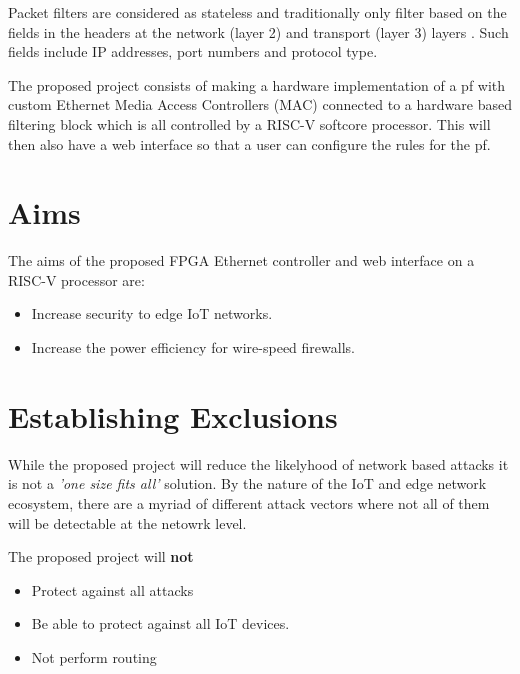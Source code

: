 Packet filters are considered as stateless and traditionally only filter based on the fields in the headers at the network (layer 2) and transport 
(layer 3) layers \cite{FirewallsBook}. Such fields include IP addresses, port numbers and protocol type.

The proposed project consists of making a hardware implementation of a pf with custom Ethernet Media Access Controllers (MAC) connected to a hardware
based filtering block which is all controlled by a RISC-V softcore processor. This will then also have a web interface so that a user can configure
the rules for the pf.



\section{Aims}

The aims of the proposed FPGA Ethernet controller and web interface on a RISC-V processor are:

\begin{itemize}
    \item Increase security to edge IoT networks.
    \item Increase the power efficiency for wire-speed firewalls.
\end{itemize}



\section{Establishing Exclusions}

While the proposed project will reduce the likelyhood of network based attacks it is not a \textit{'one size fits all'} solution. 
By the nature of the IoT and edge network ecosystem, there are a myriad of different attack vectors where not all of them will be detectable at the
netowrk level.

The proposed project will \textbf{not}
\begin{itemize}
    \item Protect against all attacks
    \item Be able to protect against all IoT devices.
    \item Not perform routing
\end{itemize}